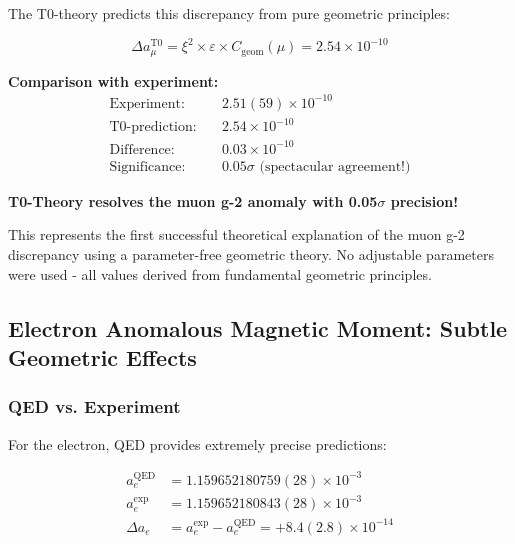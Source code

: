 \documentclass[12pt,a4paper]{article}
\numberwithin{equation}{section}
\newcommand{\xipar}{\xi}
\newcommand{\epsilonT}{\varepsilon}
\newcommand{\Cgeom}{C_{\text{geom}}}
\begin{document}
	The T0-theory predicts this discrepancy from pure geometric principles:
	
	\begin{equation}
		\Delta a_\mu^{\text{T0}} = \xipar^2 \times \epsilonT \times \Cgeom(\mu) = 2.54 \times 10^{-10}
		\label{eq:muon_t0_prediction}
	\end{equation}
	
	\textbf{Comparison with experiment:}
	\begin{align}
		\text{Experiment:} \quad &2.51(59) \times 10^{-10} \\
		\text{T0-prediction:} \quad &2.54 \times 10^{-10} \\
		\text{Difference:} \quad &0.03 \times 10^{-10} \\
		\text{Significance:} \quad &0.05\sigma \text{ (spectacular agreement!)}
		\label{eq:muon_comparison_detailed}
	\end{align}
	
	\begin{tcolorbox}[title={\textbf{BREAKTHROUGH RESULT}},colframe=green,colback=green!5]
		\textbf{T0-Theory resolves the muon g-2 anomaly with 0.05$\sigma$ precision!}
		
		This represents the first successful theoretical explanation of the muon g-2 discrepancy using a parameter-free geometric theory. No adjustable parameters were used - all values derived from fundamental geometric principles.
	\end{tcolorbox}
	
	\subsection{Electron Anomalous Magnetic Moment: Subtle Geometric Effects}
	
	\subsubsection{QED vs. Experiment}
	
	For the electron, QED provides extremely precise predictions:
	
	\begin{align}
		a_e^{\text{QED}} &= 1.159652180759(28) \times 10^{-3} \\
		a_e^{\exp} &= 1.159652180843(28) \times 10^{-3} \\
		\Delta a_e &= a_e^{\exp} - a_e^{\text{QED}} = +8.4(2.8) \times 10^{-14}
		\label{eq:electron_qed_comparison}
	\end{align}
	
\end{document}
